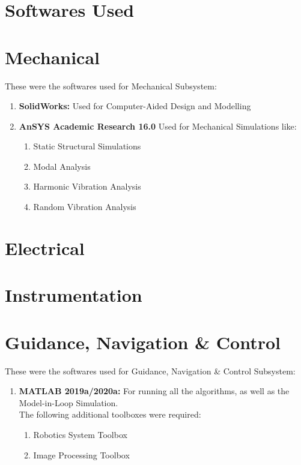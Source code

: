 \documentclass[../../main.tex]{subfiles}
\begin{document}
\section{Softwares Used}
\thispagestyle{fancy}

\section*{Mechanical}
These were the softwares used for Mechanical Subsystem:
\begin{enumerate}
    \item \textbf{SolidWorks:} Used for Computer-Aided Design and Modelling
    \item \textbf{AnSYS Academic Research 16.0 } Used for Mechanical Simulations like:
    \begin{enumerate}
        \item Static Structural Simulations
        \item Modal Analysis
        \item Harmonic Vibration Analysis
        \item Random Vibration Analysis
    \end{enumerate}

\end{enumerate}

\section*{Electrical}
\blindtext

\section*{Instrumentation}
\blindtext

\section*{Guidance, Navigation \& Control}

These were the softwares used for Guidance, Navigation \& Control Subsystem:

\begin{enumerate}
    \item \textbf{MATLAB 2019a/2020a:} For running all the algorithms, as well as the Model-in-Loop Simulation. \\
    The following additional toolboxes were required:
    \begin{enumerate}
        \item Robotics System Toolbox
        \item Image Processing Toolbox
    \end{enumerate}
\end{enumerate}
\newpage
\end{document}
